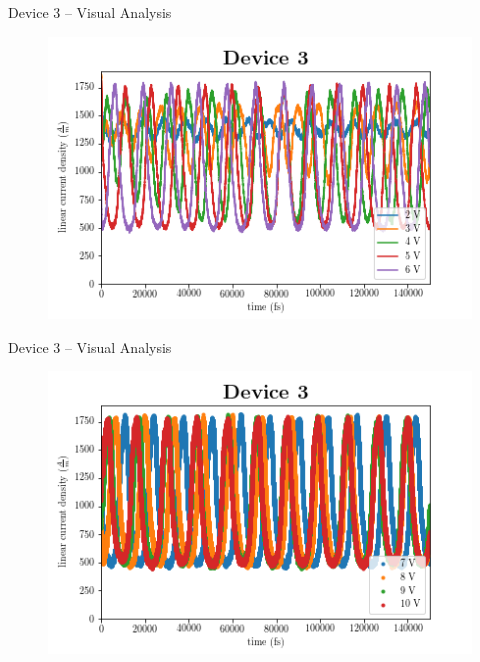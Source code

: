 \documentclass{beamer}
\begin{document}
\begin{frame}{Device 3 -- Visual Analysis}

\begin{figure}
    \centering
    \includegraphics[scale=0.5]{Figures/Device_3/2_to_6V.png}
    \label{fig:dev_3_2}
\end{figure}

\end{frame}

\begin{frame}{Device 3 -- Visual Analysis}
\begin{figure}
    \centering
    \includegraphics[scale=0.5]{Figures/Device_3/7_to_10V.png}
    \label{fig:dev_3_3}
\end{figure}
\end{frame}
\end{document}
